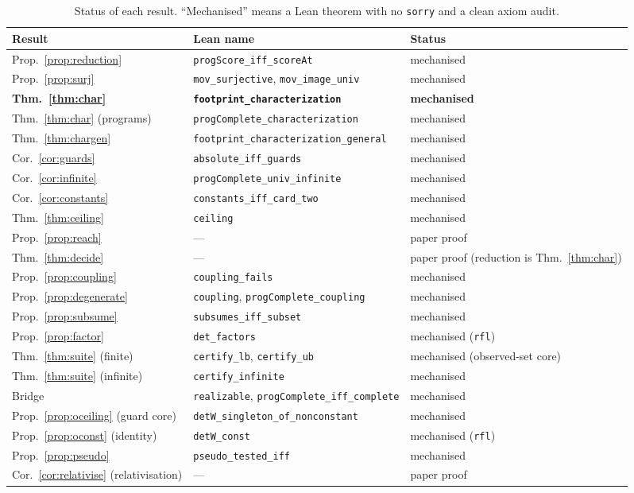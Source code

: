 \documentclass[runningheads,envcountsect,envcountsame]{llncs}
\begin{document}
\begin{table}[t]
\centering
\caption{Status of each result. ``Mechanised'' means a Lean theorem with no
\texttt{sorry} and a clean axiom audit.}
\label{tab:status}
\begin{tabular}{@{}llp{3.1cm}@{}}
\toprule
Result & Lean name & Status \\
\midrule
Prop.~\ref{prop:reduction} & \texttt{progScore\_iff\_scoreAt} & mechanised \\
Prop.~\ref{prop:surj} & \texttt{mov\_surjective}, \texttt{mov\_image\_univ} & mechanised \\
\textbf{Thm.~\ref{thm:char}} & \textbf{\texttt{footprint\_characterization}} & \textbf{mechanised} \\
Thm.~\ref{thm:char} (programs) & \texttt{progComplete\_characterization} & mechanised \\
Thm.~\ref{thm:chargen} & \texttt{footprint\_char\-acterization\_general} & mechanised \\
Cor.~\ref{cor:guards} & \texttt{absolute\_iff\_guards} & mechanised \\
Cor.~\ref{cor:infinite} & \texttt{progComplete\_univ\_infinite} & mechanised \\
Cor.~\ref{cor:constants} & \texttt{constants\_iff\_card\_two} & mechanised \\
Thm.~\ref{thm:ceiling} & \texttt{ceiling} & mechanised \\
Prop.~\ref{prop:reach} & --- & paper proof \\
Thm.~\ref{thm:decide} & --- & paper proof (reduction is Thm.~\ref{thm:char}) \\
Prop.~\ref{prop:coupling} & \texttt{coupling\_fails} & mechanised \\
Prop.~\ref{prop:degenerate} & \texttt{coupling}, \texttt{progComplete\_coupling} & mechanised \\
Prop.~\ref{prop:subsume} & \texttt{subsumes\_iff\_subset} & mechanised \\
Prop.~\ref{prop:factor} & \texttt{det\_factors} & mechanised (\texttt{rfl}) \\
Thm.~\ref{thm:suite} (finite) & \texttt{certify\_lb}, \texttt{certify\_ub} & mechanised (observed-set core) \\
Thm.~\ref{thm:suite} (infinite) & \texttt{certify\_infinite} & mechanised \\
Bridge & \texttt{realizable}, \texttt{progComplete\_iff\_complete} & mechanised \\
Prop.~\ref{prop:oceiling} (guard core) & \texttt{detW\_singleton\_of\_nonconstant} & mechanised \\
Prop.~\ref{prop:oconst} (identity) & \texttt{detW\_const} & mechanised (\texttt{rfl}) \\
Prop.~\ref{prop:pseudo} & \texttt{pseudo\_tested\_iff} & mechanised \\
Cor.~\ref{cor:relativise} (relativisation) & --- & paper proof \\
\bottomrule
\end{tabular}
\end{table}
\end{document}
